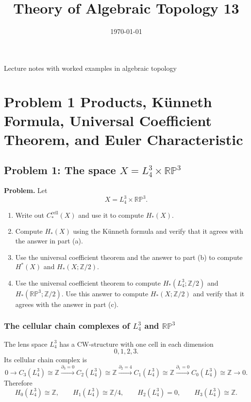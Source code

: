\documentclass[12pt,a4paper]{article}
\title{\vspace{-1.5em}\bfseries Theory of Algebraic Topology 13}
\author{}
\date{\today}
\theoremstyle{notespace}
\begin{document}
	\maketitle
	\thispagestyle{plain}
		\begin{center}
		\begin{minipage}{0.92\textwidth}
			Lecture notes with worked examples in algebraic topology
		\end{minipage}
	\end{center}
		\tableofcontents
	\clearpage


\section{Problem 1 Products, Künneth Formula, Universal Coefficient Theorem, and Euler Characteristic}

\subsection{Problem 1: The space \(X=L_4^3\times \mathbb{RP}^3\)}

\textbf{Problem.}
Let
\[
X=L_4^3\times \mathbb{RP}^3.
\]
\begin{enumerate}
	\item[(a)] Write out \(C_*^{\mathrm{cell}}(X)\) and use it to compute \(H_*(X)\).
	\item[(b)] Compute \(H_*(X)\) using the Künneth formula and verify that it agrees with the answer in part (a).
	\item[(c)] Use the universal coefficient theorem and the answer to part (b) to compute \(H^*(X)\) and \(H_*(X;\mathbb Z/2)\).
	\item[(d)] Use the universal coefficient theorem to compute \(H_*(L_4^3;\mathbb Z/2)\) and \(H_*(\mathbb{RP}^3;\mathbb Z/2)\). Use this answer to compute \(H_*(X;\mathbb Z/2)\) and verify that it agrees with the answer in part (c).
\end{enumerate}

\subsubsection{The cellular chain complexes of \(L_4^3\) and \(\mathbb{RP}^3\)}

The lens space \(L_4^3\) has a CW-structure with one cell in each dimension
\[
0,1,2,3.
\]
Its cellular chain complex is
\[
0
\longrightarrow C_3(L_4^3)\cong \mathbb Z
\xrightarrow{\partial_3=0}
C_2(L_4^3)\cong \mathbb Z
\xrightarrow{\partial_2=4}
C_1(L_4^3)\cong \mathbb Z
\xrightarrow{\partial_1=0}
C_0(L_4^3)\cong \mathbb Z
\longrightarrow 0.
\]
Therefore
\[
H_0(L_4^3)\cong \mathbb Z,
\qquad
H_1(L_4^3)\cong \mathbb Z/4,
\qquad
H_2(L_4^3)=0,
\qquad
H_3(L_4^3)\cong \mathbb Z.
\]
\end{document}

